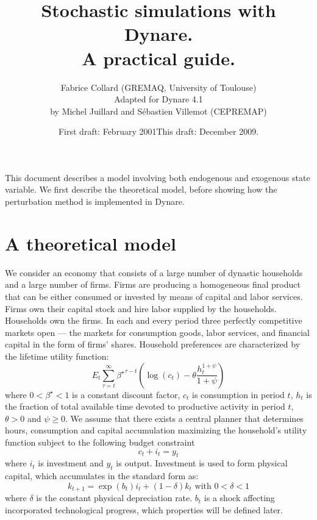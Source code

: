 \documentclass[11pt,a4paper]{article}
\begin{document}
\title{Stochastic simulations with {\sc Dynare}. \\ A practical guide.}
\author{Fabrice Collard (GREMAQ, University of Toulouse)\\Adapted for Dynare 4.1\\ by Michel Juillard and S\'ebastien Villemot (CEPREMAP)}
\date{First draft: February 2001\hspace{10mm}This draft: December 2009.}
\maketitle
This document describes a model involving both endogenous and exogenous state variable. We first describe the theoretical model, before showing how the perturbation method is implemented in {\sc Dynare}.

\section{A theoretical model} 
We consider an economy that consists of a large number of dynastic households and a large number of firms. Firms are producing a homogeneous final product that can be either consumed or invested by means of capital and labor services. Firms own their capital stock and hire labor supplied by the households. Households own the firms. In each and every period three perfectly competitive markets open --- the markets for consumption goods, labor services, and financial capital in the form of firms' shares. 
Household preferences are characterized by the lifetime utility function:
\begin{equation}
  E_t\sum_{\tau=t}^{\infty}{\beta^\star}^{\tau-t} \left(\log(c_t)-\theta\frac{h_t^{1+\psi}}{1+\psi}\right)
  \label{eq:ut}
\end{equation}
\noindent where $0<\beta^\star<1$ is a constant discount factor, $c_t$ is consumption in period
$t$, $h_t$ is the fraction of total available time devoted to productive activity in period $t$, $\theta>0$ and $\psi\geqslant 0$. We assume that there exists a central planner that determines hours, consumption and capital accumulation maximizing the household's utility function subject to the following budget constraint 
\begin{equation}
  c_t+i_t=y_t
  \label{eq:bud}
\end{equation}
\noindent where $i_t$ is investment and $y_t$ is output. Investment is used to form physical capital, which accumulates in the standard form as:
\begin{equation}
k_{t+1}=\exp(b_t) i_t+(1-\delta)k_t \mbox{ with } 0<\delta<1
\label{eq:acc}
\end{equation}
where $\delta$ is the constant physical depreciation rate. $b_t$ is a shock affecting incorporated technological progress, which properties will be defined later.
\end{document}
